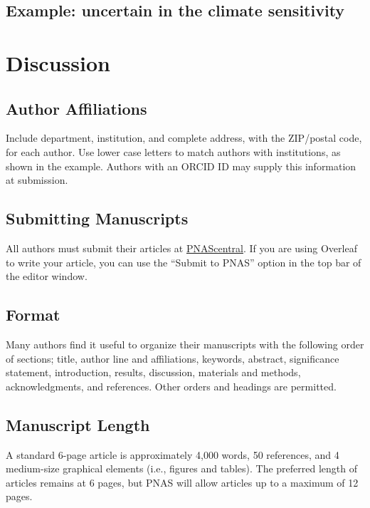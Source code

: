 \documentclass[9pt,twocolumn,twoside,lineno]{pnas-new}
\begin{document}
\subsection*{Example: uncertain in the climate sensitivity}

\section*{Discussion}

\subsection*{Author Affiliations}

Include department, institution, and complete address, with the ZIP/postal code, for each author. Use lower case letters to match authors with institutions, as shown in the example. Authors with an ORCID ID may supply this information at submission.

\subsection*{Submitting Manuscripts}

All authors must submit their articles at \href{http://www.pnascentral.org/cgi-bin/main.plex}{PNAScentral}. If you are using Overleaf to write your article, you can use the ``Submit to PNAS'' option in the top bar of the editor window. 

\subsection*{Format}

Many authors find it useful to organize their manuscripts with the following order of sections;  title, author line and affiliations, keywords, abstract, significance statement, introduction, results, discussion, materials and methods, acknowledgments, and references. Other orders and headings are permitted.

\subsection*{Manuscript Length}

A standard 6-page article is approximately 4,000 words, 50 references, and 4 medium-size graphical elements (i.e., figures and tables). The preferred length of articles remains at 6 pages, but PNAS will allow articles up to a maximum of 12 pages.
\end{document}
